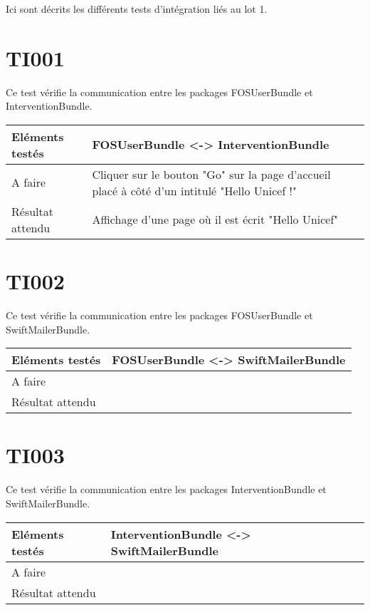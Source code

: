 
Ici sont décrits les différents tests d'intégration liés au lot 1.

\section{TI001}
	 Ce test vérifie la communication entre les packages FOSUserBundle et InterventionBundle.
	 \begin{center}
     	\begin{tabular}[h]{|p{}|p{}|}
		\hline
			Eléments testés & FOSUserBundle <-> InterventionBundle \\\hline
    			A faire & Cliquer sur le bouton "Go" sur la page d'accueil placé à côté d'un intitulé "Hello Unicef !" \\\hline
    			Résultat attendu & Affichage d'une page où il est écrit "Hello Unicef" \\\hline
     	\end{tabular}
  	\end{center}	
  	
\section{TI002}
	 Ce test vérifie la communication entre les packages FOSUserBundle et SwiftMailerBundle.
	 \begin{center}
     	\begin{tabular}[h]{|p{}|p{}|}
		\hline
			Eléments testés & FOSUserBundle <-> SwiftMailerBundle \\\hline
    			A faire & \\\hline
    			Résultat attendu & \\\hline
     	\end{tabular}
  	\end{center}	
  	
  	
 \section{TI003}
	 Ce test vérifie la communication entre les packages InterventionBundle et SwiftMailerBundle.
	 \begin{center}
     	\begin{tabular}[h]{|p{}|p{}|}
		\hline
			Eléments testés & InterventionBundle <-> SwiftMailerBundle \\\hline
    			A faire & \\\hline
    			Résultat attendu & \\\hline
     	\end{tabular}
  	\end{center}		
